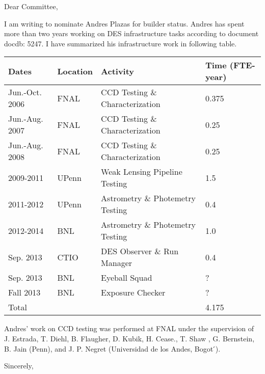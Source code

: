 \documentclass[12pt]{letter}
\begin{document}
\begin{letter}{}

\opening{Dear Committee,}

I am writing to nominate Andres Plazas for builder status.  Andres has spent
more than two years working on DES infrastructure tasks according to document
docdb: 5247. I have summarized his infrastructure work in following table.

\begin{tabular}{|l|l|l|l|}
    \hline
    Dates              & Location & Activity                         & Time (FTE-year) \\ \hline \hline
    Jun.-Oct. 2006     & FNAL     & CCD Testing \& Characterization  & 0.375 \\
    Jun.-Aug. 2007     & FNAL     & CCD Testing \& Characterization  & 0.25  \\
    Jun.-Aug. 2008     & FNAL     & CCD Testing \& Characterization  & 0.25  \\
    \hline
    2009-2011          & UPenn    & Weak Lensing Pipeline Testing    & 1.5 \\
    \hline
    2011-2012          & UPenn    & Astrometry \& Photemetry Testing & 0.4 \\
    2012-2014          & BNL      & Astrometry \& Photemetry Testing & 1.0 \\
    \hline
    Sep. 2013          & CTIO     & DES Observer \& Run Manager      & 0.4 \\
    \hline 
    Sep. 2013          & BNL      & Eyeball Squad                    & ? \\
    \hline 
    Fall 2013          & BNL      & Exposure Checker                 & ? \\
    \hline
    \hline
    Total              &          &                                  & 4.175 \\
    \hline
\end{tabular}

Andres' work on CCD testing was performed at FNAL under the supervision of J.
Estrada, T. Diehl, B. Flaugher, D. Kubik, H. Cease., T. Shaw , G.  Bernstein,
B. Jain (Penn), and J. P. Negret (Universidad de los Andes, Bogot ́).



\closing{Sincerely, }

\end{letter}
\end{document}
